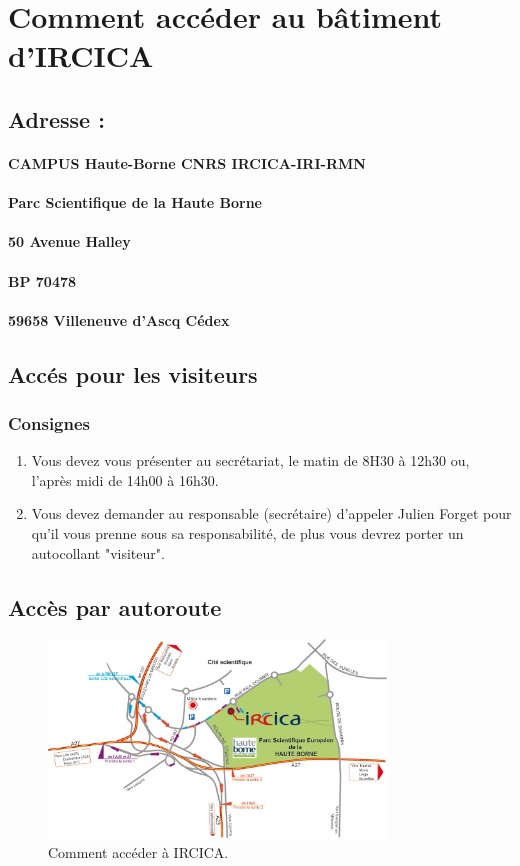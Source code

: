 \documentclass[a4paper]{article}
\begin{document}
\section{Comment accéder au bâtiment d'IRCICA} 

\subsection{Adresse :}

    \paragraph{CAMPUS Haute-Borne CNRS IRCICA-IRI-RMN}
    \paragraph{Parc Scientifique de la Haute Borne}
    \paragraph{50 Avenue Halley}
    \paragraph{BP 70478}
    \paragraph{59658 Villeneuve d’Ascq Cédex}


\subsection{Accés pour les visiteurs}
\subsubsection{Consignes}
\begin{enumerate}
\item Vous devez vous présenter au secrétariat, le matin de 8H30 à 12h30 ou, l’après midi de 14h00 à 16h30.
\item Vous devez demander au responsable (secrétaire) d'appeler Julien Forget pour qu'il vous prenne sous sa responsabilité, de plus vous devrez porter un autocollant "visiteur".
\end{enumerate}

\subsection{Accès par autoroute}

\begin{figure}[!ht]
\centering
\includegraphics[width=0.8\textwidth]{acces-IRCICA-HB.jpg}
\caption{\label{fig:IRCICA}Comment accéder à IRCICA.}
\end{figure}
\end{document}
